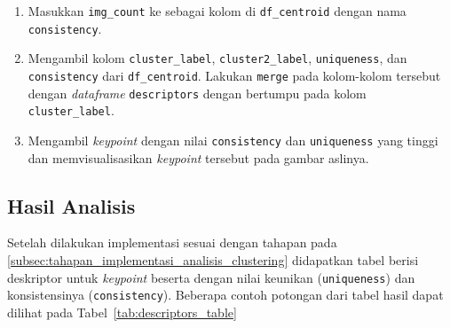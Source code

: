 \begin{enumerate}
	\item Masukkan \texttt{img\_count} ke sebagai kolom di \texttt{df\_centroid} dengan nama \texttt{consistency}.
	\item Mengambil kolom \texttt{cluster\_label}, \texttt{cluster2\_label}, \texttt{uniqueness}, dan \texttt{consistency} dari \texttt{df\_centroid}. Lakukan \texttt{merge} pada kolom-kolom tersebut dengan \textit{dataframe} \texttt{descriptors} dengan bertumpu pada kolom \texttt{cluster\_label}.
	\item Mengambil \textit{keypoint} dengan nilai \texttt{consistency} dan \texttt{uniqueness} yang tinggi dan memvisualisasikan \textit{keypoint} tersebut pada gambar aslinya.
\end{enumerate}

\subsection{Hasil Analisis}
Setelah dilakukan implementasi sesuai dengan tahapan pada \ref{subsec:tahapan_implementasi_analisis_clustering} didapatkan tabel berisi deskriptor untuk \textit{keypoint} beserta dengan nilai keunikan (\texttt{uniqueness}) dan konsistensinya (\texttt{consistency}). Beberapa contoh potongan dari tabel hasil dapat dilihat pada Tabel~\ref{tab:descriptors_table}
